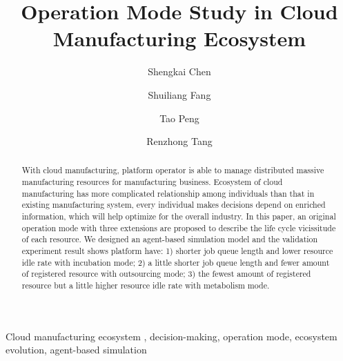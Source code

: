 
\title{Operation Mode Study in Cloud Manufacturing Ecosystem
}

\author[add1]{Shengkai Chen}
\author[add2,add1]{Shuiliang Fang}
\author[add2]{Tao Peng}
\author[add2]{Renzhong Tang}
\address[add2]{The State Key Laboratory of Fluid Power Transmission and Control, College of Mechanical Engineering, Zhejiang University, Hangzhou, 310027, China}
\address[add1]{Key Laboratory of Advanced Manufacturing Technology of Zhejiang Province, College of Mechanical Engineering, Zhejiang University, Hangzhou , 310027, China}



\begin{abstract}
With cloud manufacturing, platform operator is able to manage distributed massive manufacturing resources for manufacturing business.
Ecosystem of cloud manufacturing has more complicated relationship among individuals than that in existing manufacturing system, every individual makes decisions depend on enriched information, which will help optimize for the overall industry. In this paper, an original operation mode with three extensions are proposed to describe the life cycle vicissitude of each resource. We designed an agent-based simulation model and the validation experiment result shows platform have: 1) shorter job queue length and lower resource idle rate with incubation mode; 2) a little shorter job queue length and fewer amount of registered resource with outsourcing mode; 3) the fewest amount of registered resource but a little higher resource idle rate with metabolism mode.


\end{abstract}

\begin{keyword}
Cloud manufacturing ecosystem \sep
decision-making\sep
operation mode\sep
ecosystem evolution\sep
agent-based simulation

\end{keyword}
